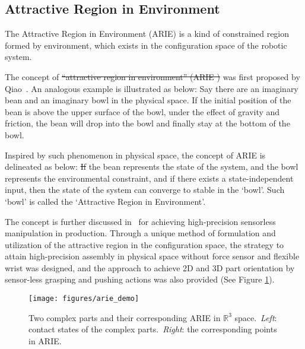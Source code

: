 \documentclass[journal,twoside,web]{ieeecolor}
\providecommand{\DIFadd}[1]{{\protect\color{blue}\uwave{#1}}} %
\providecommand{\DIFdel}[1]{{\protect\color{red}\sout{#1}}}                      %
\providecommand{\DIFaddbegin}{} %
\providecommand{\DIFaddend}{} %
\providecommand{\DIFdelbegin}{} %
\providecommand{\DIFdelend}{} %
\newcommand{\DIFscaledelfig}{0.5}
\newlength{\DIFdelgraphicswidth} %
\newlength{\DIFdelgraphicsheight} %
\newcommand{\DIFaddincludegraphics}[2][]{{\color{blue}\fbox{\DIFOincludegraphics[#1]{#2}}}} %
\newcommand{\DIFdelincludegraphics}[2][]{%
\sbox{\DIFdelgraphicsbox}{\DIFOincludegraphics[#1]{#2}}%
\settoboxwidth{\DIFdelgraphicswidth}{\DIFdelgraphicsbox} %
\settoboxtotalheight{\DIFdelgraphicsheight}{\DIFdelgraphicsbox} %
\scalebox{\DIFscaledelfig}{%
\parbox[b]{\DIFdelgraphicswidth}{\usebox{\DIFdelgraphicsbox}\\[-\baselineskip] \rule{\DIFdelgraphicswidth}{0em}}\llap{\resizebox{\DIFdelgraphicswidth}{\DIFdelgraphicsheight}{%
\setlength{\unitlength}{\DIFdelgraphicswidth}%
\begin{picture}(1,1)%
\thicklines\linethickness{2pt} %
{\color[rgb]{1,0,0}\put(0,0){\framebox(1,1){}}}%
{\color[rgb]{1,0,0}\put(0,0){\line( 1,1){1}}}%
{\color[rgb]{1,0,0}\put(0,1){\line(1,-1){1}}}%
\end{picture}%
}\hspace*{3pt}}} %
} %
\DeclareRobustCommand{\DIFaddbegin}{\DIFOaddbegin \let\includegraphics\DIFaddincludegraphics} %
\DeclareRobustCommand{\DIFaddend}{\DIFOaddend \let\includegraphics\DIFOincludegraphics} %
\DeclareRobustCommand{\DIFdelbegin}{\DIFOdelbegin \let\includegraphics\DIFdelincludegraphics} %
\DeclareRobustCommand{\DIFdelend}{\DIFOaddend \let\includegraphics\DIFOincludegraphics} %
\begin{document}
\subsection{Attractive Region in Environment}
\label{subsec:arie}

The Attractive Region in Environment (ARIE) is a kind of constrained region formed by \DIFaddbegin \DIFadd{the }\DIFaddend environment, which exists in the configuration space of the robotic system.  

The concept of \DIFdelbegin \DIFdel{``attractive region in environment'' (ARIE ) }\DIFdelend \DIFaddbegin \DIFadd{ARIE }\DIFaddend was first proposed by Qiao~\cite{Qiao2000}. An analogous example is illustrated as below: Say there are an imaginary bean and an imaginary bowl in the physical space. If the initial position of the bean is above the upper surface of the bowl, under the effect of gravity and friction, the bean will drop into the bowl and finally stay at the bottom of the bowl.

Inspired by such phenomenon in physical space, the concept of ARIE is delineated as below: 
\DIFdelbegin \DIFdel{If }\DIFdelend \DIFaddbegin \DIFadd{if }\DIFaddend the bean represents the state of the system, and the bowl represents the environmental constraint, and if there exists a state-independent input, then the state of the system can converge to stable in the `bowl'. Such `bowl' is called the `Attractive Region in Environment'.

The concept is further discussed in~\cite{Qiao2002, Qiao2003} for achieving high-precision sensorless manipulation in production. Through a unique method of formulation and utilization of the attractive region in the configuration space, the strategy to attain high-precision assembly in physical space without \DIFaddbegin \DIFadd{a }\DIFaddend force sensor and flexible wrist was designed, and the approach to achieve 2D and 3D part orientation by sensor-less grasping and pushing actions was also provided (See Figure \ref{fig:arie}).



\begin{figure}[ht]
    \centering
    \texttt{[image: figures/arie\_demo]}
    \caption{Two complex parts and their corresponding ARIE in $\mathbb{R}^3$ space.~\textit{Left}: contact states of the complex parts.~\textit{Right}: the corresponding points in ARIE.}
    \label{fig:arie}
\end{figure}
\end{document}
